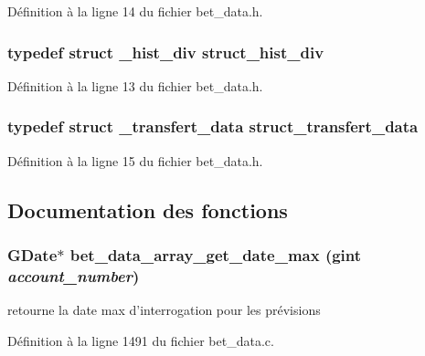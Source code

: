 Définition à la ligne 14 du fichier bet\_\-data.h.

\subsubsection[{struct\_\-hist\_\-div}]{\setlength{\rightskip}{0pt plus 5cm}typedef struct {\bf \_\-hist\_\-div} {\bf struct\_\-hist\_\-div}}\label{bet__data_8h_a177b490589a96c75bc5d9083b8088c75}


Définition à la ligne 13 du fichier bet\_\-data.h.

\subsubsection[{struct\_\-transfert\_\-data}]{\setlength{\rightskip}{0pt plus 5cm}typedef struct {\bf \_\-transfert\_\-data} {\bf struct\_\-transfert\_\-data}}\label{bet__data_8h_a916544ee758dd6ec43bf5a6bb5978caf}


Définition à la ligne 15 du fichier bet\_\-data.h.



\subsection{Documentation des fonctions}
\subsubsection[{bet\_\-data\_\-array\_\-get\_\-date\_\-max}]{\setlength{\rightskip}{0pt plus 5cm}GDate$\ast$ bet\_\-data\_\-array\_\-get\_\-date\_\-max (gint {\em account\_\-number})}\label{bet__data_8h_a0ad9a8f139c9c1fe907454b3130192c3}
retourne la date max d'interrogation pour les prévisions 

Définition à la ligne 1491 du fichier bet\_\-data.c.

